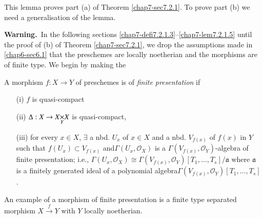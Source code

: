 This lemma proves part (a) of Theorem \ref{chap7-sec7.2.1}. To prove part
(b) we need a generalisation of the lemma.

\medskip
\noindent
{\bf Warning.}~In the following sections
\ref{chap7-defi7.2.1.3}--\ref{chap7-lem7.2.1.5} until the proof of (b)
of Theorem 
\ref{chap7-sec7.2.1}, we drop the assumptions made in
\ref{chap6-sec6.1} that the 
preschemes are locally noetherian and the morphisms are of finite
type. We begin by making the 

\setcounter{subdefin}{2}
\begin{subdefin}\label{chap7-defi7.2.1.3}
A morphism $f:X\to Y$ of preschemes is of {\em finite presentation} if
\begin{itemize}
\item[(i)] $f$ is quasi-compact

\item[(ii)] $\Delta:X\to \fprod{X}{X}{Y}$ is quasi-compact,

\item[(iii)] for every $x\in X$, $\exists$ a nbd. $U_{x}$ of $x\in X$
  and a nbd. $V_{f(x)}$ of $f(x)$ in $Y$ such that $f(U_{x})\subset
  V_{f(x)}$ and\pageoriginale $\Gamma(U_{x},\mathscr{O}_{X})$ is a
  $\Gamma(V_{f(x)},\mathscr{O}_{Y})$-algebra of finite presentation;
  i.e., $\Gamma(U_{x},\mathscr{O}_{X})\cong
  \Gamma(V_{f(x)},\mathscr{O}_{Y})[T_{1},\ldots,T_{s}]/\mathfrak{a}$
  where $\mathfrak{a}$ is a finitely generated ideal of a polynomial
  algebra\break $\Gamma(V_{f(x)},\mathscr{O}_{Y})[T_{1},\ldots,T_{s}]$. 
\end{itemize}
\end{subdefin}

An example of a morphism of finite presentation is a finite type
separated morphism $X\xrightarrow{f}Y$ with $Y$ locally noetherian.

